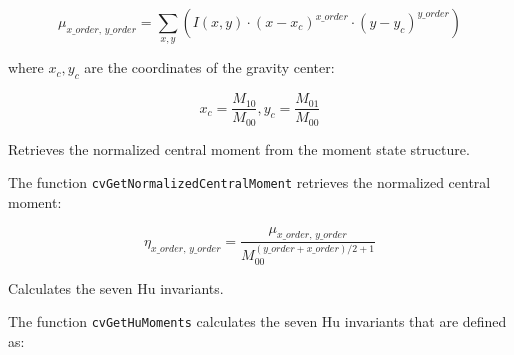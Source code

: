 \[
\mu_{x\_order, \, y\_order} = \sum_{x,y} (I(x,y) \cdot (x-x_c)^{x\_order} \cdot (y-y_c)^{y\_order})
\]

where $x_c,y_c$ are the coordinates of the gravity center:

\[
x_c=\frac{M_{10}}{M_{00}}, y_c=\frac{M_{01}}{M_{00}}
\]

\label{GetNormalizedCentralMoment}

Retrieves the normalized central moment from the moment state structure.


\begin{description}
\end{description}

The function \texttt{cvGetNormalizedCentralMoment} retrieves the normalized central moment:

\[
\eta_{x\_order, \, y\_order} = \frac{\mu_{x\_order, \, y\_order}}{M_{00}^{(y\_order+x\_order)/2+1}}
\]

\label{GetHuMoments}

Calculates the seven Hu invariants.


\begin{description}
\end{description}

The function \texttt{cvGetHuMoments} calculates the seven Hu invariants that are defined as:

